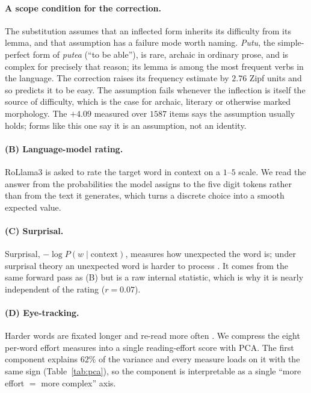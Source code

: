\paragraph{A scope condition for the correction.}
\label{sec:scope}
The substitution assumes that an inflected form inherits its difficulty
from its lemma, and that assumption has a failure mode worth naming.
\emph{Putu}, the simple-perfect form of \emph{putea} (``to be able''), is
rare, archaic in ordinary prose, and is complex for precisely that reason; its
lemma is among the most frequent verbs in the language. The correction
raises its frequency estimate by $2.76$ Zipf units and so predicts it to
be easy. The assumption fails whenever the inflection is itself the
source of difficulty, which is the case for archaic, literary or
otherwise marked morphology. The $+4.09$ measured over $1587$ items says
the assumption usually holds; forms like this one say it is an
assumption, not an identity.

\paragraph{(B) Language-model rating.}
RoLlama3 is asked to rate the target word in context on a $1$--$5$
scale. We read the answer from the probabilities the model assigns to
the five digit tokens rather than from the text it generates, which
turns a discrete choice into a smooth expected value.

\paragraph{(C) Surprisal.}
Surprisal, $-\log P(w \mid \mathrm{context})$, measures how unexpected
the word is; under surprisal theory an unexpected word is harder to
process \citep{hale2001probabilistic}. It comes from the same forward
pass as (B) but is a raw internal statistic, which is why it is nearly
independent of the rating ($r = 0.07$).

\paragraph{(D) Eye-tracking.}
Harder words are fixated longer and re-read more often
\citep{rayner1998eye}. We compress the eight per-word effort measures
into a single reading-effort score with PCA. The first component
explains $62\%$ of the variance and every measure loads on it with the
same sign (Table~\ref{tab:pca}), so the component is interpretable as a
single ``more effort $=$ more complex'' axis.

